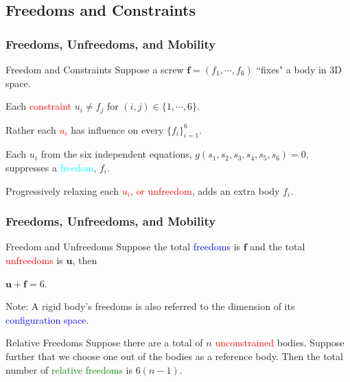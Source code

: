 \subsection{Freedoms and Constraints}
\begin{frame}
	\frametitle{Freedoms, Unfreedoms, and Mobility}
	\begin{block}{Freedom and Constraints}
		Suppose a screw $\bm{f}=(f_1,\cdots, f_6)$ ``fixes" a body in 3D space. 
		\begin{description}
			\item Each \textcolor{red}{constraint} $u_i \neq f_j$ for $(i,j)\in \{1,\cdots,6\}$.
			\item Rather each \textcolor{red}{$u_i$} has influence on every $\{f_i\}_{i=1}^{6}$.
			\item Each $u_i$ from the six independent equations, $g(s_1, s_2, s_3, s_4, s_5, s_6)=0$, suppresses a \textcolor{cyan}{freedom}, $f_i$.
			\item Progressively relaxing each \textcolor{red}{$u_i$}, \textcolor{red}{or unfreedom}, adds an extra body $f_i$.
		\end{description}
	\end{block}
\end{frame}


\begin{frame}
	\frametitle{Freedoms, Unfreedoms, and Mobility}
	\begin{block}{Freedom and Unfreedoms}
		Suppose the total \textcolor{blue}{freedoms} is $\bm{f}$ and the total \textcolor{red}{unfreedoms} is $\bm{u}$, then
		\begin{description}
			\item $\bm{u}+\bm{f}=6.$
			\label{eq:freedomunfreedom}
		\end{description}
	Note: A rigid body's freedoms is also referred to the dimension of  its \textcolor{blue}{configuration space}.
	\end{block}
	\begin{block}{Relative Freedoms}
		Suppose there are a total of $n$ \textcolor{red}{unconstrained} bodies. Suppose further that we choose one out of the bodies as a reference body. Then the total number of \textcolor{green}{relative freedoms} is $6(n-1)$.
	\end{block}
\end{frame}

